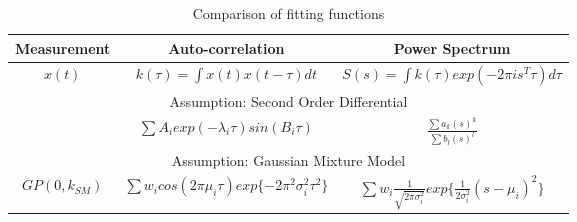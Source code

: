 \renewcommand{\arraystretch}{1.2}
\begin{table}[!ht]
    \centering
\begin{tabularx}{\textwidth}{c|c|c}
  \hline
  Measurement & Auto-correlation & Power Spectrum \\
  \hline
  $x(t)$ & $k(\tau) = \int x(t)x(t-\tau)dt$ &  $S(s) = \int k(\tau)exp(-2 \pi i s^{T} \tau )d\tau$\\
  \hline \hline
  \multicolumn{3}{|c|}{Assumption: Second Order Differential}\\
  \hline
   & $ \sum A_{i}exp(-\lambda_{i}\tau)sin(B_{i}\tau)$ & $\frac{\sum a_{k}(s)^{k}}{\sum b_{l}(s)^{l}}$\\
   \hline \hline
   \multicolumn{3}{|c|}{Assumption: Gaussian Mixture Model}\\
   \hline
   $GP(0 , k_{SM})$ 
   & $  \sum w_{i} cos(2\pi\mu_{i}\tau) exp\{-2\pi^{2}\sigma_{i}^{2}\tau^{2}\}$ 
   & $ \sum w_{i}  \frac{1}{\sqrt{2\pi\sigma_{i}^{2}}}exp\{\frac{1}{2\sigma_{i}^{2}}(s-\mu_{i})^{2}\} $\\
   \hline
\end{tabularx}
\caption{Comparison of fitting functions}
  \label{tab:comparisonOfFittingFunctions}
\end{table}

